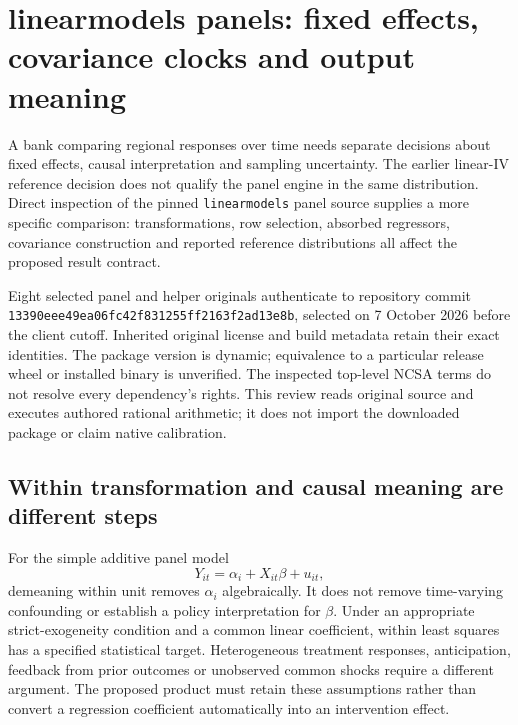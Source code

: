\section{linearmodels panels: fixed effects, covariance clocks and output meaning}
\label{sec:exec24-linearmodels-panel}

A bank comparing regional responses over time needs separate decisions about
fixed effects, causal interpretation and sampling uncertainty. The earlier
linear-IV reference decision does not qualify the panel engine in the same
distribution. Direct inspection of the pinned \texttt{linearmodels} panel
source supplies a more specific comparison: transformations, row selection,
absorbed regressors, covariance construction and reported reference
distributions all affect the proposed result contract.
\citep{exec22_linearmodels_reuse,exec24_lmpanel_source,exec24_lmpanel_reference}

Eight selected panel and helper originals authenticate to repository commit
\texttt{13390eee\allowbreak{}49ea06fc\allowbreak{}42f83125\allowbreak{}5ff2163f\allowbreak{}2ad13e8b}, selected on
7 October 2026 before the client cutoff. Inherited original license and
build metadata retain their exact identities. The package version is dynamic;
equivalence to a particular release wheel or installed binary is unverified.
The inspected top-level NCSA terms do not resolve every dependency's rights.
This review reads original source and executes authored rational arithmetic;
it does not import the downloaded package or claim native calibration.
\citep{exec22_linearmodels_reuse,exec24_lmpanel_source}

\subsection{Within transformation and causal meaning are different steps}
For the simple additive panel model
\[
 Y_{it}=\alpha_i+X_{it}\beta+u_{it},
\]
demeaning within unit removes $\alpha_i$ algebraically. It does not remove
time-varying confounding or establish a policy interpretation for $\beta$.
Under an appropriate strict-exogeneity condition and a common linear
coefficient, within least squares has a specified statistical target.
Heterogeneous treatment responses, anticipation, feedback from prior
outcomes or unobserved common shocks require a different argument. The
proposed product must retain these assumptions rather than convert a
regression coefficient automatically into an intervention effect.
\citep{exec24_lmpanel_reference}

